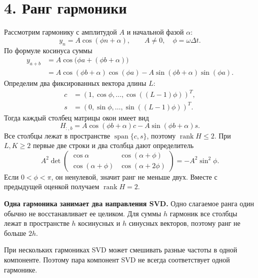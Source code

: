 \documentclass[11pt,a4paper]{article}
\begin{document}
\section*{4. Ранг гармоники}
Рассмотрим гармонику с амплитудой $A$ и начальной фазой $\alpha$:
\[
 y_n=A\cos(\phi n+\alpha),\qquad A\ne0,\quad \phi=\omega\Delta t.
\]
По формуле косинуса суммы
\begin{align*}
 y_{a+b}
 &=A\cos\bigl(\phi a+(\phi b+\alpha)\bigr)\\
 &=A\cos(\phi b+\alpha)\cos(\phi a)
   -A\sin(\phi b+\alpha)\sin(\phi a).
\end{align*}
Определим два фиксированных вектора длины $L$:
\begin{align*}
 c&=(1,\cos\phi,\ldots,\cos((L-1)\phi))^T,\\
 s&=(0,\sin\phi,\ldots,\sin((L-1)\phi))^T.
\end{align*}
Тогда каждый столбец матрицы окон имеет вид
\[
 H_{:,b}=A\cos(\phi b+\alpha)c-A\sin(\phi b+\alpha)s.
\]
Все столбцы лежат в пространстве $\operatorname{span}\{c,s\}$,
поэтому $\operatorname{rank}H\leq2$.
При $L,K\geq2$ первые две строки и два столбца дают определитель
\[
 A^2\det\begin{pmatrix}
 \cos\alpha&\cos(\alpha+\phi)\\
 \cos(\alpha+\phi)&\cos(\alpha+2\phi)
 \end{pmatrix}=-A^2\sin^2\phi.
\]
Если $0<\phi<\pi$, он ненулевой, значит ранг не меньше двух.
Вместе с предыдущей оценкой получаем $\operatorname{rank}H=2$.

\textbf{Одна гармоника занимает два направления SVD.}
Одно слагаемое ранга один обычно не восстанавливает ее целиком.
Для суммы $h$ гармоник все столбцы лежат в пространстве $h$ косинусных
и $h$ синусных векторов, поэтому ранг не больше $2h$.

При нескольких гармониках SVD может смешивать разные частоты в одной
компоненте. Поэтому пара компонент SVD не всегда соответствует
одной гармонике.
\end{document}

